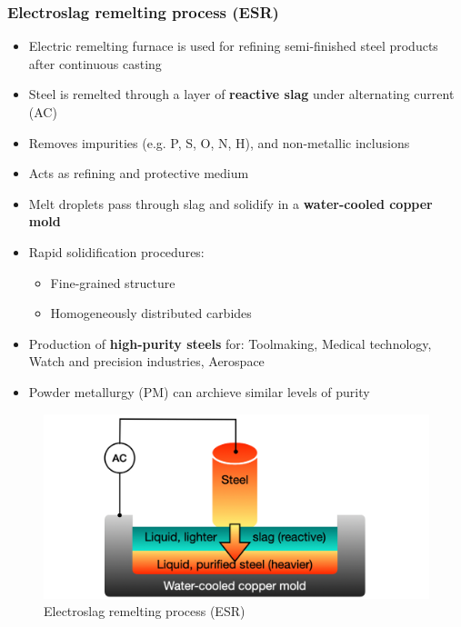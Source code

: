 \documentclass{article}
\begin{document}
\subsubsection{Electroslag remelting process (ESR)}
\begin{itemize}
  \item Electric remelting furnace is used for refining semi-finished steel products after continuous casting
  \item Steel is remelted through a layer of \textbf{reactive slag} under alternating current (AC)
\end{itemize}

\begin{itemize}
  \item Removes impurities (e.g. P, S, O, N, H), and non-metallic inclusions
  \item Acts as refining and protective medium
\end{itemize}

\begin{itemize}
  \item Melt droplets pass through slag and solidify in a \textbf{water-cooled copper mold}
  \item Rapid solidification procedures:
  \begin{itemize}
    \item Fine-grained structure
    \item Homogeneously distributed carbides
  \end{itemize}
\end{itemize}

\begin{itemize}
  \item Production of \textbf{high-purity steels} for: Toolmaking, Medical technology, Watch and precision industries, Aerospace
\end{itemize}

\begin{itemize}
  \item Powder metallurgy (PM) can archieve similar levels of purity
\end{itemize}

\begin{figure}[ht!]
  \centering
  \includegraphics[width=.8\textwidth]{media/ESR.png}
  \caption*{Electroslag remelting process (ESR)}
\end{figure}
\end{document}
